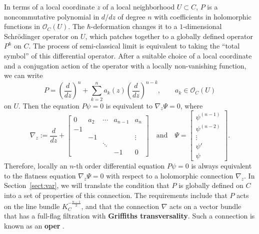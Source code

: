 \documentclass{amsart}
\theoremstyle{definition}
\numberwithin{equation}{section}
\numberwithin{figure}{section}
\newcommand{\be}{\begin{equation}}
\newcommand{\ee}{\end{equation}}
\newcommand{\cO}{{\mathcal{O}}}
\begin{document}
In terms of a local coordinate $z$ of a local neighborhood
 $U\subset C$, $P$ is a noncommutative
polynomial in $d/dz$ of degree $n$ with coefficients in 
holomorphic functions in $\cO_C(U)$. The $\hbar$-deformation changes it
to a $1$-dimensional Schr\"odinger operator on $U$, which patches
together to a 
globally  defined operator $P^\hbar$ on $C$. The process of semi-classical limit is 
equivalent to taking the ``total symbol'' of this differential operator.
After a suitable choice of a local 
coordinate and a conjugation action of the operator
with a locally non-vanishing function, we can write 
\be
\label{nth order}
P=\left(\frac{d}{dz}\right)^n + \sum_{k=2} ^n a_k(z) 
\left(\frac{d}{dz}\right)^{n-k}, \qquad a_k\in \cO_C(U)
\ee
on $U$.
Then the equation  $P\psi = 0$ is equivalent to $\nabla_z \Psi = 0$,
where
\be
\label{introconn}
\nabla_z := \frac{d}{dz} + \begin{bmatrix}
0&a_2&\cdots&a_{n-1}&a_n\\
-1&\\
&-1&&&\vdots\\
&&\ddots\\
&&&-1&0
\end{bmatrix} \quad \text{and}\quad
\Psi
=
\begin{bmatrix}
\psi^{(n-1)}\\
\psi^{(n-2)}\\
\vdots\\
\psi'\\
\psi
\end{bmatrix}.
\ee
Therefore, locally an $n$-th order differential equation $P\psi=0$
is always equivalent to the flatness equation $\nabla_z\Psi=0$ with respect
to a holomorphic connection $\nabla_z$. In Section~\ref{sect:var},
we will translate the condition that $P$ is globally defined on $C$ into
a set of properties of this connection. The requirements include that
$P$ acts on the line bundle $K_C^{-\frac{n-1}{2}}$, and that
the connection $\nabla$ acts on a vector bundle 
that has a full-flag filtration with \textbf{Griffiths transversality}.
Such a connection is known as an \textbf{oper} \cite{BD, BZF}.
\end{document}
